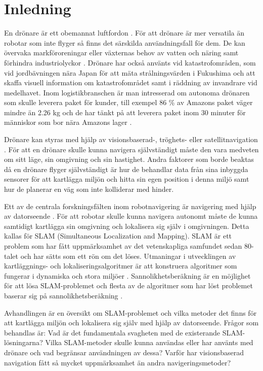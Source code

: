 \chapter{Inledning}

En drönare är ett obemannat luftfordon \citep{geospatial}. För att drönare är mer versatila än robotar som inte flyger så finns det särskilda användningsfall för dem. De kan övervaka markföroreningar eller växternas behov av vatten och näring samt förhindra industriolyckor \citep{crowdsurveillance}. Drönare har också använts vid katastrofområden, som vid jordbävningen nära Japan för att mäta strålningsvärden i Fukushima och att skaffa visuell information om katastrofområdet samt i räddning av invandrare vid medelhavet. Inom logistikbranschen är man intresserad om autonoma drönaren som skulle leverera paket för kunder, till exempel 86 \% av Amazons paket väger mindre än 2.26 kg och de har tänkt på att leverera paket inom 30 minuter för människor som bor nära Amazons lager \citep{cbsnews}.

Drönare kan styras med hjälp av visionsbaserad-, tröghets- eller satellitnavigation \citep{geospatial}. För att en drönare skulle kunna navigera självständigt måste den vara medveten om sitt läge, sin omgivning och sin hastighet. Andra faktorer som borde beaktas då en drönare flyger självständigt är hur de behandlar data från sina inbyggda sensorer för att kartlägga miljön och hitta sin egen position i denna miljö samt hur de planerar en väg som inte kolliderar med hinder.

Ett av de centrala forskningsfälten inom robotnavigering är navigering med hjälp av datorseende \citep{982903}. För att robotar skulle kunna navigera autonomt måste de kunna samtidigt kartlägga sin omgivning och lokalisera sig själv i omgivningen. Detta kallas för SLAM (Simultaneous Localization and Mapping). SLAM är ett problem som har fått uppmärksamhet av det vetenskapliga samfundet sedan 80-talet och har sätts som ett rön om det löses. Utmaningar i utvecklingen av kartläggnings- och lokaliseringsalgoritmer är att konstruera algoritmer som fungerar i dynamiska och stora miljöer \citep{realslamproblem}. Sannolikhetsberäkning är en möjlighet för att lösa SLAM-problemet och flesta av de algoritmer som har löst problemet baserar sig på sannolikhetsberäkning \citep{ProbabilisticRobotics}.

Avhandlingen är en översikt om SLAM-problemet och vilka metoder det finns för att kartlägga miljön och lokalisera sig själv med hjälp av datorseende. Frågor som behandlas är: Vad är det fundamentala svagheten med de existerande SLAM-lösningarna? Vilka SLAM-metoder skulle kunna användas eller har använts med drönare och vad begränsar användningen av dessa? Varför har visionsbaserad navigation fått så mycket uppmärksamhet än andra navigeringsmetoder?


